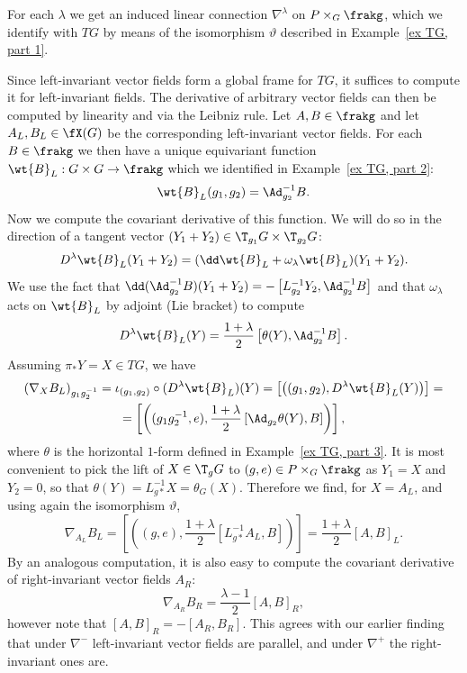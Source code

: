 \begin{example}\label{ex connections on G, part 3}
    For each $\lambda$ we get an induced linear connection $\nabla^\lambda$ on $P\times_G \frakg$, which we identify with $TG$ by means of the isomorphism $\vartheta$ described in Example~\ref{ex TG, part 1}. 

    Since left-invariant vector fields form a global frame for $TG$, it suffices to compute it for left-invariant fields. The derivative of arbitrary vector fields can then be computed by linearity and via the Leibniz rule. Let $A,B\in\frakg$ and let $A_L,B_L\in\fX(G)$ be the corresponding left-invariant vector fields. 
    For each $B\in\frakg$ we then have a unique equivariant function $\wt{B}_L:G\times G\to \frakg$ which we identified in Example~\ref{ex TG, part 2}:
    \[
        \wt{B}_L(g_1,g_2)=\Ad_{g_2}^{-1}B.
    \]
    Now we compute the covariant derivative of this function. We will do so in the direction of a tangent vector $(Y_1+Y_2)\in \T_{g_1}G\times \T_{g_2}G$:
    \[D^\lambda \wt{B}_L(Y_1+Y_2)=(\dd\wt{B}_L+\omega_\lambda \wt{B}_L)(Y_1+Y_2).\]
    We use the fact that $\dd (\Ad_{g_2}^{-1} B)(Y_1+Y_2)=-\left[ L_{g_2}^{-1}Y_2,\Ad_{g_2}^{-1}B\right]$ and that $\omega_\lambda$ acts on $\wt{B}_L$ by adjoint (Lie bracket) to compute
    \[D^\lambda \wt{B}_L(Y)=\frac{1+\lambda}{2}\left[\theta(Y),\Ad_{g_2}^{-1}B\right].\]
    Assuming $\pi_\ast Y=X\in TG$, we have
    \begin{multline}
        \left( \nabla_X B_L \right)_{g_1g_2^{-1}}=\iota_{(g_1,g_2)}\circ (D^\lambda \wt{B}_L)(Y)=\left[\left( (g_1,g_2),D^\lambda \wt{B}_L(Y) \right)\right]=\\=\left[\left( (g_1g_2^{-1},e),\frac{1+\lambda}{2}\left[\Ad_{g_2}\theta(Y),B\right]\right)\right],
    \end{multline}
    where $\theta$ is the horizontal $1$-form defined in Example~\ref{ex TG, part 3}.
    It is most convenient to pick the lift of $X\in \T_g G$ to $(g,e)\in P\times_G \frakg$ as $Y_1=X$ and $Y_2=0$, so that $\theta(Y)=L_{g\ast}^{-1}X=\theta_G(X)$. Therefore we find, for $X=A_L$, and using again the isomorphism $\vartheta$,
    \[\nabla_{A_L}B_L=\left[\left( (g,e),\frac{1+\lambda}{2}[L_{g\ast}^{-1}A_L,B] \right)\right]=\frac{1+\lambda}{2}[A,B]_L.\]
    By an analogous computation, it is also easy to compute the covariant derivative of right-invariant vector fields $A_R$:
    \[\nabla_{A_R}B_R=\frac{\lambda-1}{2}[A,B]_R,\]
    however note that $[A,B]_R=-[A_R,B_R]$. This agrees with our earlier finding that under $\nabla^-$ left-invariant vector fields are parallel, and under $\nabla^+$ the right-invariant ones are.  
    

\end{example}
